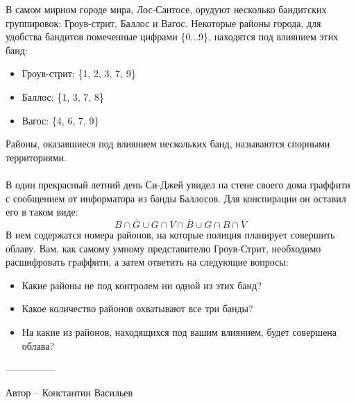 \question
В самом мирном городе мира, Лос-Сантосе, орудуют несколько бандитских группировок: Гроув-стрит, Баллос и Вагос. Некоторые районы города, для удобства бандитов помеченные цифрами \{0...9\}, находятся под влиянием этих банд:
\begin{itemize}
    \item Гроув-стрит: \{1, 2, 3, 7, 9\}
    \item Баллос: \{1, 3, 7, 8\}
    \item Вагос: \{4, 6, 7, 9\}
\end{itemize}
Районы, оказавшиеся под влиянием нескольких банд, называются спорными территориями.
\\
\\
В один прекрасный летний день Си-Джей увидел на стене своего дома граффити с сообщением от информатора из банды Баллосов. Для конспирации он оставил его в таком виде:
\begin{equation*}
B \cap \overline{G} \cup G \cap V \cap \overline{B} \cup G \cap B \cap \overline{V}
\end{equation*}
В нем содержатся номера районов, на которые полиция планирует совершить облаву. Вам, как самому умному представителю Гроув-Стрит, необходимо расшифровать граффити, а затем ответить на следующие вопросы:

\begin{itemize}
    \item Какие районы не под контролем ни одной из этих банд?
    \item Какое количество районов охватывают все три банды?
    \item На какие из районов, находящихся под вашим влиянием, будет совершена облава?
\end{itemize}

---------------

Автор -- Константин Васильев
